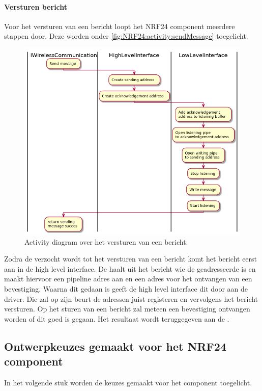 \documentclass[a4paper, 11pt, oneside]{report}
\begin{document}
\paragraph{Versturen bericht}
\label{DetailedDesign:NRF24:activity:recieveMessage}
Voor het versturen van een bericht loopt het NRF24 component meerdere stappen door. Deze worden onder \autoref{fig:NRF24:activity:sendMessage} toegelicht.
\begin{figure}[H]
	\begin{center}\includegraphics[width=.9\linewidth]{UML/out/NRF24/activity/sendMessage/sendMessage.png}\end{center}
	\caption{Activity diagram over het versturen van een bericht.}
	\label{fig:NRF24:activity:sendMessage}
\end{figure}
Zodra de  verzocht wordt tot het versturen van een bericht komt het bericht eerst aan in de high level interface.
De haalt uit het bericht wie de geadresseerde is en maakt hiervoor een pipeline adres aan en een adres voor het ontvangen van een bevestiging.
Waarna dit gedaan is geeft de high level interface dit door aan de driver.
Die zal op zijn beurt de adressen juist registeren en vervolgens het bericht versturen.
Op het sturen van een bericht zal meteen een bevestiging ontvangen worden of dit goed is gegaan.
Het resultaat wordt teruggegeven aan de .


\subsection{Ontwerpkeuzes gemaakt voor het NRF24 component}
\label{DetailedDesign:NRF24:ontwerkeuzes}
In het volgende stuk worden de keuzes gemaakt voor het component toegelicht.
\end{document}
